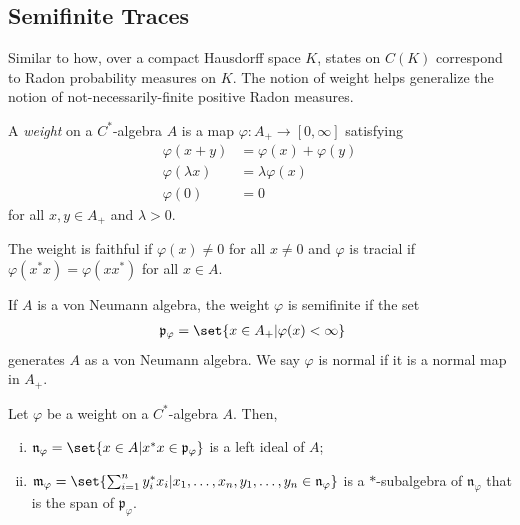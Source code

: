 \documentclass[10pt]{mypackage}
\begin{document}
\subsection{Semifinite Traces}%
Similar to how, over a compact Hausdorff space $K$, states on $C(K)$ correspond to Radon probability measures on $K$. The notion of weight helps generalize the notion of not-necessarily-finite positive Radon measures.
\begin{definition}
  A \textit{weight} on a $C^{\ast}$-algebra $A$ is a map $\varphi\colon A_{+}\rightarrow [0,\infty]$ satisfying
  \begin{align*}
    \varphi\left( x + y \right) &= \varphi\left( x \right) + \varphi\left( y \right)\\
    \varphi\left( \lambda x \right) &= \lambda\varphi\left( x \right)\\
    \varphi\left( 0 \right) &= 0
  \end{align*}
  for all $x,y\in A_{+}$ and $\lambda > 0$.

  The weight is faithful if $\varphi\left( x \right) \neq 0$ for all $x\neq 0$ and $\varphi$ is tracial if $\varphi\left( x^{\ast}x \right) = \varphi\left( xx^{\ast} \right)$ for all $x\in A$.
  
  If $A$ is a von Neumann algebra, the weight $\varphi$ is semifinite if the set
  \begin{align*}
    \mathfrak{p}_{\varphi} &= \set{x\in A_{+} | \varphi(x) < \infty}
  \end{align*}
  generates $A$ as a von Neumann algebra. We say $\varphi$ is normal if it is a normal map in $A_{+}$.
\end{definition}
\begin{proposition}
  Let $\varphi$ be a weight on a $C^{\ast}$-algebra $A$. Then,
  \begin{enumerate}[(i)]
    \item $\mathfrak{n}_{\varphi} = \set{x\in A | x^{\ast}x\in \mathfrak{p}_{\varphi}}$ is a left ideal of $A$;
    \item $\mathfrak{m}_{\varphi} = \set{\sum_{i=1}^{n}y_i^{\ast}x_i | x_1,\dots,x_n,y_1,\dots,y_n\in \mathfrak{n}_{\varphi}}$ is a $\ast$-subalgebra of $\mathfrak{n}_{\varphi}$ that is the span of $\mathfrak{p}_{\varphi}$.
  \end{enumerate}
\end{proposition}
\end{document}
